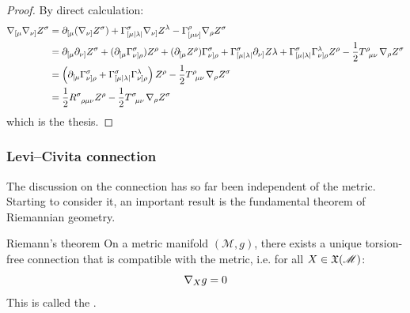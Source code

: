 \begin{proofbox}
  \begin{proof}
    By direct calculation:
    \begin{equation*}
      \begin{split}
        \na_{[\mu} \na_{\nu]} Z^\sigma
        &= \pa_{[\mu} (\na_{\nu]} Z^\sigma) + \Gamma^\sigma_{[\mu | \lambda |} \na_{\nu]} Z^\lambda - \Gamma^\rho_{[\mu \nu]} \na_\rho Z^\sigma \\
        &= \pa_{[\mu} \pa_{\nu]} Z^\sigma + (\pa_{[\mu} \Gamma^\sigma_{\nu]\rho}) Z^\rho + (\pa_{[\mu} Z^\rho) \Gamma^\sigma_{\nu]\rho} + \Gamma^\sigma_{[\mu | \lambda |} \pa_{\nu]} Z\lambda + \Gamma^\sigma_{[\mu | \lambda |} \Gamma^\lambda_{\nu] \rho} Z^\rho - \frac{1}{2} \tensor{T}{^\rho_{\mu \nu}} \na_\rho Z^\sigma \\
        &= \left( \pa_{[\mu} \Gamma^\sigma_{\nu]\rho} + \Gamma^\sigma_{[\mu | \lambda |} \Gamma^\lambda_{\nu]\rho} \right) Z^\rho - \frac{1}{2} \tensor{T}{^\rho_{\mu \nu}} \na_\rho Z^\sigma \\
        &= \frac{1}{2} \tensor{R}{^\sigma_{\rho \mu \nu}} Z^\rho - \frac{1}{2} \tensor{T}{^\sigma_{\mu \nu}} \na_\rho Z^\sigma
      \end{split}
    \end{equation*}
    which is the thesis.
  \end{proof}
\end{proofbox}

\subsubsection{Levi--Civita connection}

The discussion on the connection has so far been independent of the metric. Starting to consider it, an important result is the fundamental theorem of Riemannian geometry.

\begin{theorem}{Riemann's theorem}{}
  On a metric manifold $ (\mathcal{M},g) $, there exists a unique torsion-free connection that is compatible with the metric, i.e. for all $ X \in \mathfrak{X}(\mathscr{M}) $:
  \begin{equation}
    \nabla_X g = 0
  \end{equation}
  This is called the .
\end{theorem}

